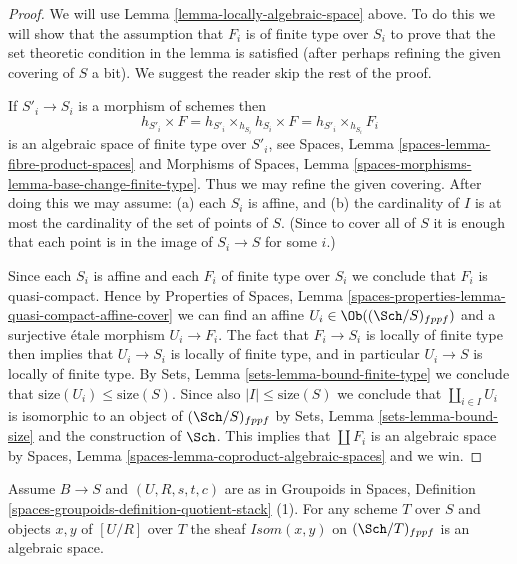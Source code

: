\begin{proof}
We will use
Lemma \ref{lemma-locally-algebraic-space}
above. To do this we will show that the assumption that
$F_i$ is of finite type over $S_i$ to prove that the set theoretic
condition in the lemma is satisfied (after perhaps refining the given
covering of $S$ a bit).
We suggest the reader skip the rest of the proof.

\medskip\noindent
If $S'_i \to S_i$ is a morphism of schemes then
$$
h_{S'_i} \times F =
h_{S'_i} \times_{h_{S_i}} h_{S_i} \times F =
h_{S'_i} \times_{h_{S_i}} F_i
$$
is an algebraic space of finite type over $S'_i$, see
Spaces, Lemma \ref{spaces-lemma-fibre-product-spaces}
and
Morphisms of Spaces,
Lemma \ref{spaces-morphisms-lemma-base-change-finite-type}.
Thus we may refine the given covering. After doing this we may assume:
(a) each $S_i$ is affine, and (b) the cardinality of $I$ is at most
the cardinality of the set of points of $S$. (Since to cover
all of $S$ it is enough that each point is in the image of $S_i \to S$
for some $i$.)

\medskip\noindent
Since each $S_i$ is affine and each $F_i$ of finite type over $S_i$
we conclude that $F_i$ is quasi-compact. Hence by
Properties of Spaces,
Lemma \ref{spaces-properties-lemma-quasi-compact-affine-cover}
we can find an affine $U_i \in \Ob((\Sch/S)_{fppf})$
and a surjective \'etale morphism $U_i \to F_i$. The fact that
$F_i \to S_i$ is locally of finite type then implies that
$U_i \to S_i$ is locally of finite type, and in particular
$U_i \to S$ is locally of finite type. By
Sets, Lemma \ref{sets-lemma-bound-finite-type}
we conclude that $\text{size}(U_i) \leq \text{size}(S)$.
Since also $|I| \leq \text{size}(S)$ we conclude that
$\coprod_{i \in I} U_i$ is isomorphic to an object of
$(\Sch/S)_{fppf}$ by
Sets, Lemma \ref{sets-lemma-bound-size}
and the construction of $\Sch$. This implies that
$\coprod F_i$ is an algebraic space by
Spaces, Lemma \ref{spaces-lemma-coproduct-algebraic-spaces}
and we win.
\end{proof}

\begin{lemma}
\label{lemma-quotient-stack-isom}
Assume $B \to S$ and $(U, R, s, t, c)$ are as in
Groupoids in Spaces,
Definition \ref{spaces-groupoids-definition-quotient-stack} (1).
For any scheme $T$ over $S$ and objects $x, y$ of $[U/R]$ over $T$
the sheaf $\mathit{Isom}(x, y)$ on $(\Sch/T)_{fppf}$
is an algebraic space.
\end{lemma}

